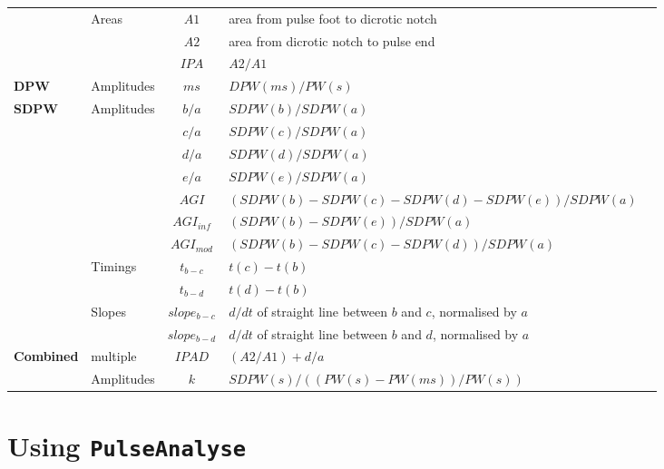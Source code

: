 \documentclass[12pt]{iopart}
\newcommand{\pa}{\texttt{PulseAnalyse}}
\begin{document}
\begin{table}[t]
\begin{tabular}{p{2cm}p{2cm}cp{8.3cm}c}
		& Areas & $A1$ & area from pulse foot to dicrotic notch & \cite{Ahn2017} \\
		& & $A2$ & area from dicrotic notch to pulse end & \cite{Ahn2017} \\
		& & $IPA$ & $A2/ A1$ & \cite{Ahn2017} \\
		\hline
		\multirow{1}{*}{\textbf{DPW}} & Amplitudes & $ms$ & $DPW(ms) / PW(s) $ & \cite{Alty2003} \\  
		\hline
		\multirow{6}{*}{\textbf{SDPW}} & Amplitudes & $b/a$ & $SDPW(b)/SDPW(a)$ & \cite{Takazawa1998} \\
		& & $c/a$ & $SDPW(c)/SDPW(a)$ & \cite{Takazawa1998} \\
		& & $d/a$ & $SDPW(d)/SDPW(a)$ & \cite{Takazawa1998} \\
		& & $e/a$ & $SDPW(e)/SDPW(a)$ & \cite{Takazawa1998} \\
		& & $AGI$ & $(SDPW(b)-SDPW(c)-SDPW(d)-SDPW(e))/SDPW(a)$ & \cite{Takazawa1998} \\
		& & $AGI_{inf}$ & $(SDPW(b)-SDPW(e))/SDPW(a)$ & \cite{Hyun2008} \\
		& & $AGI_{mod}$ & $(SDPW(b)-SDPW(c)-SDPW(d))/SDPW(a)$ & \cite{Ushiroyama2005} \\
		& Timings & $t_{b-c}$ & $t(c) - t(b)$ & \cite{Ahn2017} \\
		& & $t_{b-d}$ & $t(d) - t(b)$ & \cite{Ahn2017} \\
		& Slopes & $slope_{b-c}$ & $d / dt$ of straight line between $b$ and $c$, normalised by $a$ & \cite{Ahn2017} \\
		& & $slope_{b-d}$ & $d / dt$ of straight line between $b$ and $d$, normalised by $a$ & \cite{Ahn2017} \\
		\hline
		\multirow{2}{*}{\textbf{Combined}} & multiple & $IPAD$ & $(A2/ A1) + d/a$ & \cite{Ahn2017} \\
		& Amplitudes & $k$ & $SDPW(s) / ( (PW(s)-PW(ms)) / PW(s) ) $& \cite{Wei2013} \\
		\hline
	\end{tabular}
\end{table}



\section{Using \pa}
\end{document}
